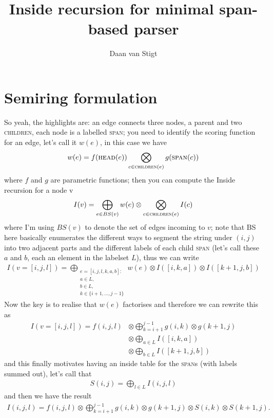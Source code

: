 \documentclass{article}
\title{Inside recursion for minimal span-based parser}
\author{Daan van Stigt}
\begin{document}
\maketitle

\section{Semiring formulation}
So yeah, the highlights are: an edge connects three nodes, a parent and two \textsc{children}, each node is a labelled \textsc{span}; you need to identify the scoring function for an edge, let’s call it $w(e)$,  in this case we have
\begin{align}
    w(e) = f(\textsc{head}(e)) \bigotimes_{c \in \textsc{children}(e)} g(\textsc{span}(c))
\end{align}
where $f$ and $g$ are parametric functions; then you can compute the Inside recursion for a node v
\begin{align}
    I(v) = \bigoplus_{e \in BS(v)} w(e) \otimes \bigotimes_{c \in \textsc{children}(e)} I(c)
\end{align}
where I’m using $BS(v)$ to denote the set of edges incoming to $v$; note that BS here basically enumerates the different ways to segment the string under $(i,j)$ into two adjacent parts and the different labels of each child \textsc{span} (let’s call these $a$ and $b$, each an element in the labelset $L$), thus we can write
\begin{align}
I(v=[i,j,l]) = \bigoplus_{ \substack{ e=[i,j,l,k,a,b]: \\ a \in L, \\ b \in L, \\ k \in \{i+1,...,j-1\} } } w(e) \otimes I([i,k,a]) \otimes I([k+1,j,b])
\end{align}
Now the key is to realise that $w(e)$ factorises and therefore we can rewrite this as
\begin{align}
    I(v=[i,j,l]) = f(i,j,l) &\otimes \bigoplus_{k=i+1}^{j-1} g(i,k) \otimes g(k+1,j) \\
        &\otimes \bigoplus_{a \in L}  I([i,k,a]) \\
        &\otimes \bigoplus_{b\in L} I([k+1,j,b])
\end{align}
and this finally motivates having an inside table for the \textsc{span}s (with labels summed out), let’s call that
\begin{align}
    S(i,j) = \bigoplus_{l \in L} I(i,j,l)
\end{align}
and then we have the result
\begin{align}
\label{eq:inside-semiring}
    I(i,j,l) = f(i,j,l)\otimes \bigoplus_{k=i+1}^{j-1} g(i,k)\otimes g(k+1,j) \otimes S(i,k) \otimes S(k+1,j).
\end{align}
\end{document}
